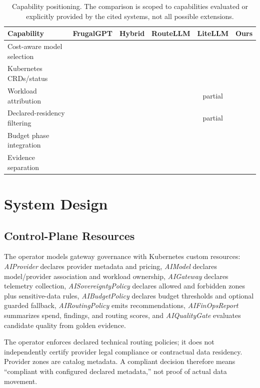 \documentclass[10pt,journal,compsoc]{IEEEtran}
\newcommand{\cmark}{\textcolor{green!55!black}{\ding{51}}}
\newcommand{\xmark}{\textcolor{red!70!black}{\ding{55}}}
\newcommand{\Ours}{\textbf{Ours}}
\begin{document}
\begin{table}[t]
\centering
\caption{Capability positioning. The comparison is scoped to capabilities
evaluated or explicitly provided by the cited systems, not all possible
extensions.}
\label{tab:positioning}
\begin{tabular}{lccccc}
\toprule
Capability & FrugalGPT & Hybrid & RouteLLM & LiteLLM & \Ours \\
\midrule
Cost-aware model selection & \cmark & \cmark & \cmark & \cmark & \cmark \\
Kubernetes CRDs/status & \xmark & \xmark & \xmark & \xmark & \cmark \\
Workload attribution & \xmark & \xmark & \xmark & partial & \cmark \\
Declared-residency filtering & \xmark & \xmark & \xmark & partial & \cmark \\
Budget phase integration & \xmark & \xmark & \xmark & \xmark & \cmark \\
Evidence separation & \xmark & \xmark & \xmark & \xmark & \cmark \\
\bottomrule
\end{tabular}
\end{table}

\section{System Design}

\subsection{Control-Plane Resources}
The operator models gateway governance with Kubernetes custom resources:
\emph{AIProvider} declares provider metadata and pricing, \emph{AIModel}
declares model/provider association and workload ownership, \emph{AIGateway}
declares telemetry collection, \emph{AISovereigntyPolicy} declares allowed and
forbidden zones plus sensitive-data rules, \emph{AIBudgetPolicy} declares
budget thresholds and optional guarded fallback, \emph{AIRoutingPolicy} emits
recommendations, \emph{AIFinOpsReport} summarizes spend, findings, and routing
scores, and \emph{AIQualityGate} evaluates candidate quality from golden
evidence.

The operator enforces declared technical routing policies; it does not
independently certify provider legal compliance or contractual data residency.
Provider zones are catalog metadata. A compliant decision therefore means
``compliant with configured declared metadata,'' not proof of actual data
movement.
\end{document}

